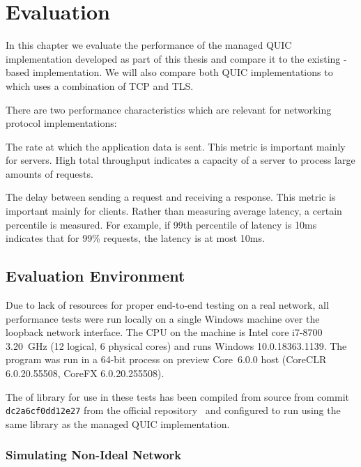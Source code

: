 \chapter{Evaluation}

In this chapter we evaluate the performance of the managed QUIC implementation developed as part of
this thesis and compare it to the existing \libmsquic{}-based implementation. We will also compare
both QUIC implementations to  which uses a combination of TCP and TLS.

There are two performance characteristics which are relevant for networking protocol implementations:

\begin{itemize}

   The rate at which the application data is sent. This metric is important mainly
for servers. High total throughput indicates a capacity of a server to process large amounts of requests.

   The delay between sending a request and receiving a response. This
metric is important mainly for clients. Rather than measuring average latency, a certain percentile
is measured. For example, if 99th percentile of latency is 10ms indicates that for 99\% requests,
the latency is at most 10ms.

\end{itemize}

\section{Evaluation Environment}

Due to lack of resources for proper end-to-end testing on a real network, all performance tests were
run locally on a single Windows machine over the loopback network interface. The CPU on the machine
is Intel core i7-8700 \SI{3.20}{\giga\hertz} (12 logical, 6 physical cores) and runs Windows
10.0.18363.1139. The program was run in a 64-bit process on preview \dotnet{} Core~6.0.0 host
(CoreCLR 6.0.20.55508, CoreFX 6.0.20.255508).

The of \libmsquic{} library for use in these tests has been compiled from source from commit
\texttt{dc2a6cf0dd12e27} from the official repository~\cite{msquicGithub} and configured to run
using the same \libopenssl{} library as the managed QUIC implementation.

\subsection{Simulating Non-Ideal Network}

